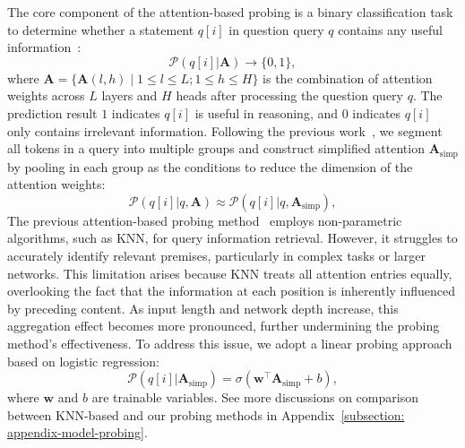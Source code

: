 The core component of the attention-based probing is a binary classification task to determine whether a statement $q[i]$ in question query $q$ contains any useful information~\citep{hou2023towards}:
\begin{equation}
\label{eq:classification_probe}
    \mathcal{P}(q[i] | \boldsymbol{A}) \rightarrow \{0, 1\},
\end{equation}
where $\boldsymbol{A}=\{\boldsymbol{A}(l, h) \mid 1 \leq l \leq L ; 1 \leq h \leq H\}$ is the combination of attention weights across $L$ layers and $H$ heads after processing the question query $q$. The prediction result $1$ indicates $q[i]$ is useful in reasoning, and $0$ indicates $q[i]$ only contains irrelevant information. Following the previous work~\citep{hou2023towards}, we segment all tokens in a query into multiple groups and construct simplified attention $\boldsymbol{A}_\text{simp}$ by pooling in each group as the conditions to reduce the dimension of the attention weights:
\begin{equation}
\label{equ:simplified_attention}
    \mathcal{P}(q[i] | q, \boldsymbol{A}) \approx \mathcal{P}(q[i] | q, \boldsymbol{A}_\text{simp}),
\end{equation}
The previous attention-based probing method~\citep{hou2023towards} employs non-parametric algorithms, such as KNN, for query information retrieval. However, it struggles to accurately identify relevant premises, particularly in complex tasks or larger networks. This limitation arises because KNN treats all attention entries equally, overlooking the fact that the information at each position is inherently influenced by preceding content. As input length and network depth increase, this aggregation effect becomes more pronounced, further undermining the probing method's effectiveness. To address this issue, we adopt a linear probing approach based on logistic regression:
\begin{equation}
    \mathcal{P}(q[i] | \boldsymbol{A}_{\mathrm{simp}}) = \sigma(\boldsymbol{w}^\top \boldsymbol{A}_{\mathrm{simp}} + b),
\end{equation}
where $\boldsymbol{w}$ and $b$ are trainable variables. See more discussions on comparison between KNN-based and our probing methods in Appendix~\ref{subsection: appendix-model-probing}.

